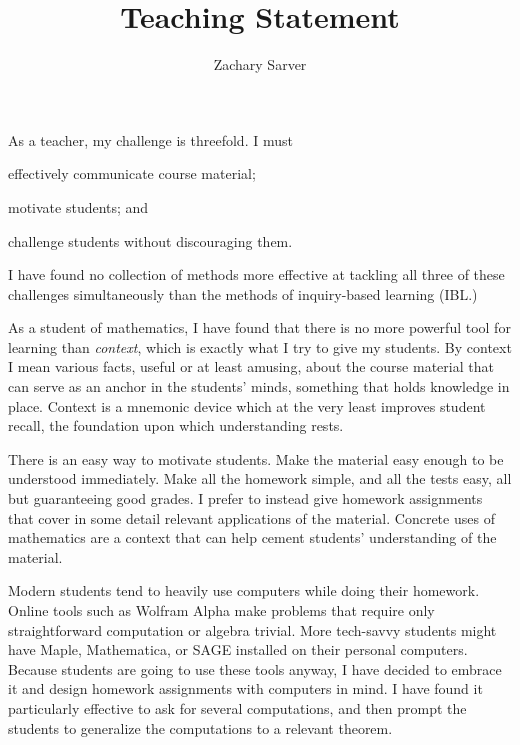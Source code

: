 \documentclass[11pt]{article}
\begin{document}
\fancyhf{}
\lhead[\thepage / \pageref{LastPage}]{Zachary Sarver}


\title{Teaching Statement}
\author{Zachary Sarver}
\date{}
\maketitle

As a teacher, my challenge is threefold. I must
\begin{inparaenum}
\item effectively communicate course material;
\item motivate students; and
\item challenge students without discouraging them.
\end{inparaenum}
I have found no collection of methods more effective at tackling all three of
these challenges simultaneously than the methods of inquiry-based learning
(IBL.)

As a student of mathematics, I have found that there is no more powerful tool
for learning than \emph{context}, which is exactly what I try to give my
students. By context I mean various facts, useful or at least amusing, about the
course material that can serve as an anchor in the students' minds, something
that holds knowledge in place. Context is a mnemonic device which at the very
least improves student recall, the foundation upon which understanding rests.

There is an easy way to motivate students. Make the material easy enough to be
understood immediately. Make all the homework simple, and all the tests easy,
all but guaranteeing good grades. I prefer to instead give homework
assignments that cover in some detail relevant applications of the
material. Concrete uses of mathematics are a context that can help cement
students' understanding of the material.

Modern students tend to heavily use computers while doing their homework. Online
tools such as Wolfram Alpha make problems that require only straightforward
computation or algebra trivial. More tech-savvy students might have Maple,
Mathematica, or SAGE installed on their personal computers. Because students are
going to use these tools anyway, I have decided to embrace it and design
homework assignments with computers in mind. I have found it particularly
effective to ask for several computations, and then prompt the students to
generalize the computations to a relevant theorem.
\end{document}
